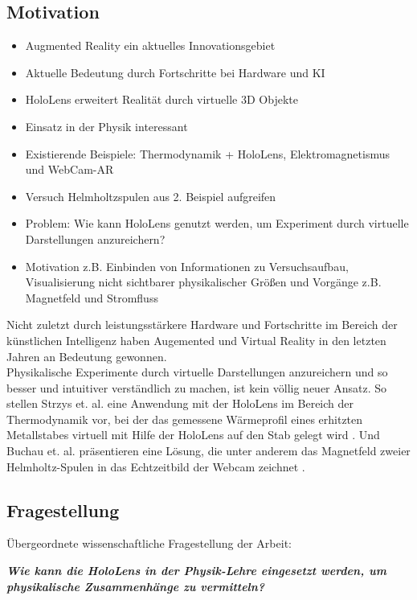 \subsection{Motivation}
\label{sec-1-1}
\begin{itemize}
	\item Augmented Reality ein aktuelles Innovationsgebiet
	\item Aktuelle Bedeutung durch Fortschritte bei Hardware und KI
	\item HoloLens erweitert Realität durch virtuelle 3D Objekte
	\item Einsatz in der Physik interessant
	\item Existierende Beispiele: Thermodynamik + HoloLens, Elektromagnetismus und WebCam-AR
	\item Versuch Helmholtzspulen aus 2. Beispiel aufgreifen
	\item Problem: Wie kann HoloLens genutzt werden, um Experiment durch virtuelle Darstellungen anzureichern?
	\item Motivation z.B. Einbinden von Informationen zu Versuchsaufbau, Visualisierung nicht sichtbarer physikalischer Größen und Vorgänge z.B. Magnetfeld und Stromfluss
\end{itemize}
Nicht zuletzt durch leistungsstärkere Hardware und Fortschritte im Bereich der künstlichen Intelligenz haben Augemented und Virtual Reality in den letzten Jahren an Bedeutung gewonnen.
\\
Physikalische Experimente durch virtuelle Darstellungen anzureichern und so besser und intuitiver verständlich zu machen, ist kein völlig neuer Ansatz. So stellen Strzys et. al. eine Anwendung mit der HoloLens im Bereich der Thermodynamik vor, bei der das gemessene Wärmeprofil eines erhitzten Metallstabes virtuell mit Hilfe der HoloLens auf den Stab gelegt wird \cite{Strzys17}. Und Buchau et. al. präsentieren eine Lösung, die unter anderem das Magnetfeld zweier Helmholtz-Spulen in das Echtzeitbild der Webcam zeichnet \cite{Buchau09}.\\ 

\subsection{Fragestellung}
\label{sec-1-2}
Übergeordnete wissenschaftliche Fragestellung der Arbeit:
\begin{center}
	\textit{\textbf{Wie kann die HoloLens in der Physik-Lehre eingesetzt werden, um physikalische Zusammenhänge zu vermitteln?}}
\end{center}

